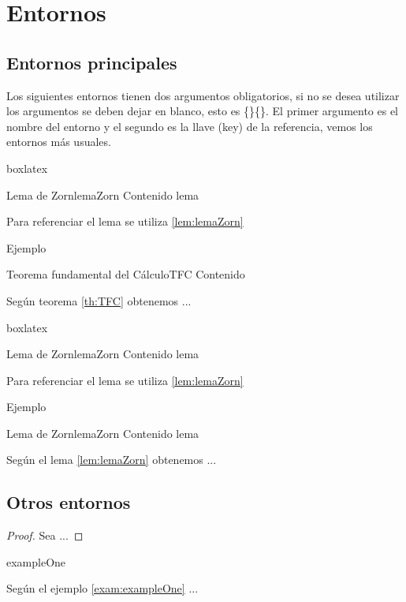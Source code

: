 {
	\justifying
	\chapter{Entornos}\label{cap:guiaDeUsuario}
	\section{Entornos principales}
	Los siguientes entornos tienen dos argumentos obligatorios, si no se desea utilizar los argumentos se deben dejar en blanco, esto es \{\}\{\}. El primer argumento es el nombre del entorno y el segundo es la llave (key) de la referencia, vemos los entornos más usuales. 
	\begin{tcblisting}{boxlatex}
		\begin{theorem}{Lema de Zorn}{lemaZorn}
			Contenido lema
		\end{theorem}
		Para referenciar el lema se utiliza \ref{lem:lemaZorn}
	\end{tcblisting}
	Ejemplo
	\begin{theorem}{Teorema fundamental del Cálculo}{TFC}
		Contenido
	\end{theorem}
	Según teorema	\ref{th:TFC} obtenemos ...
	
	\begin{tcblisting}{boxlatex}
		\begin{lemma}{Lema de Zorn}{lemaZorn}
			Contenido lema
		\end{lemma}
		Para referenciar el lema se utiliza \ref{lem:lemaZorn}
	\end{tcblisting}
	Ejemplo
	\begin{lemma}{Lema de Zorn}{lemaZorn}
		Contenido lema
	\end{lemma}
	Según el lema \ref{lem:lemaZorn} obtenemos ...
	\newpage
	\section{Otros entornos}
	\begin{proof}
		Sea ...
	\end{proof}
	
	\begin{example}{}{exampleOne}
		\lipsum[1]
	\end{example}
	Según el ejemplo \ref{exam:exampleOne}  ...
	\begin{solution}
		\lipsum[1]
	\end{solution}
}
